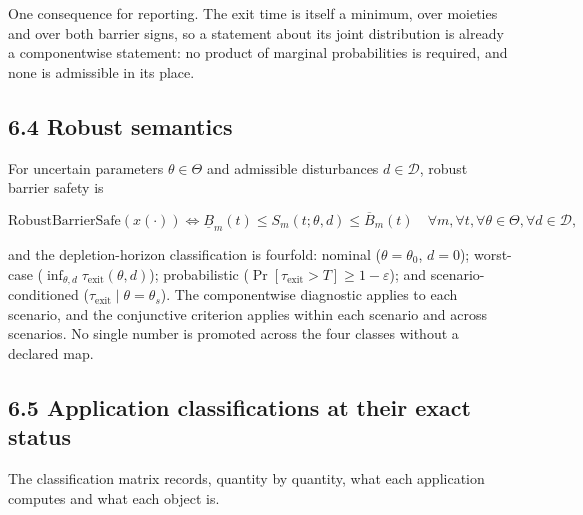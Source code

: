 \documentclass[11pt]{article}
\begin{document}
One consequence for reporting. The exit time is itself a minimum, over moieties and over both barrier signs, so a statement about its joint distribution is already a componentwise statement: no product of marginal probabilities is required, and none is admissible in its place.

\subsection*{6.4 Robust semantics}\label{64-robust-semantics}

For uncertain parameters \(\theta \in \Theta\) and admissible disturbances \(d \in \mathcal{D}\), robust barrier safety is 

$$\mathrm{RobustBarrierSafe}(x(\cdot)) \iff \underline{B}_m(t) \le S_m(t; \theta, d) \le \overline{B}_m(t) \quad \forall m, \forall t, \forall \theta \in \Theta, \forall d \in \mathcal{D},$$

 and the depletion-horizon classification is fourfold: nominal (\(\theta = \theta_0\), \(d = 0\)); worst-case (\(\inf_{\theta,\allowbreak{}d} \tau_{\mathrm{exit}}(\theta,\allowbreak{}d)\)); probabilistic (\(\Pr[\tau_{\mathrm{exit}} > T] \ge 1 - \varepsilon\)); and scenario-conditioned (\(\tau_{\mathrm{exit}} \mid \theta =\allowbreak{} \theta_s\)). The componentwise diagnostic applies to each scenario, and the conjunctive criterion applies within each scenario and across scenarios. No single number is promoted across the four classes without a declared map.

\subsection*{6.5 Application classifications at their exact status}\label{65-application-classifications-at-their-exact-status}

The classification matrix records, quantity by quantity, what each application computes and what each object is.
\end{document}
